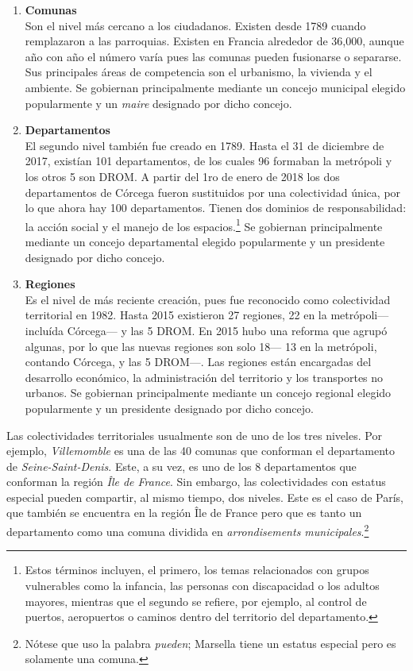 \begin{enumerate}
\item \textbf{Comunas} \\ 
Son el nivel más cercano a los ciudadanos. Existen desde 1789 cuando remplazaron a las parroquias. Existen en Francia alrededor de 36,000, aunque año con año el número varía pues las comunas pueden fusionarse o separarse. Sus principales áreas de competencia son el urbanismo, la vivienda y el ambiente. Se gobiernan principalmente mediante un concejo municipal elegido popularmente y un \textit{maire} designado por dicho concejo.

\item \textbf{Departamentos}\\ 
El segundo nivel también fue creado en 1789. Hasta el 31 de diciembre de 2017, existían 101 departamentos, de los cuales 96 formaban la metrópoli y los otros 5 son DROM. A partir del  1ro de enero de 2018 los dos departamentos de Córcega fueron sustituidos por una colectividad única, por lo que ahora hay 100 departamentos. Tienen dos dominios de responsabilidad: la acción social y el manejo de los espacios.\footnote{Estos términos incluyen, el primero, los temas relacionados con grupos vulnerables como la infancia, las personas con discapacidad o los adultos mayores, mientras que el segundo se refiere, por ejemplo, al control de puertos, aeropuertos o caminos dentro del territorio del departamento.} Se gobiernan principalmente mediante un concejo departamental elegido popularmente y un presidente designado por dicho concejo.

\item \textbf{Regiones}\\ 
Es el nivel de más reciente creación, pues fue reconocido como colectividad territorial en 1982. Hasta 2015 existieron 27 regiones, 22 en la metrópoli--- incluída Córcega--- y las 5 DROM. En 2015 hubo una reforma que agrupó algunas, por lo que las nuevas regiones son solo 18--- 13 en la metrópoli, contando Córcega, y las 5 DROM---. Las regiones están encargadas del desarrollo económico, la administración del territorio y los transportes no urbanos. Se gobiernan principalmente mediante un concejo regional elegido popularmente y un presidente designado por dicho concejo.
\end{enumerate} 

Las colectividades territoriales usualmente son de uno de los tres niveles. Por ejemplo, \textit{Villemomble} es una de las 40 comunas que conforman el departamento de \textit{Seine-Saint-Denis}. Este, a su vez, es uno de los 8 departamentos que conforman la región \textit{Île de France}. Sin embargo, las colectividades con estatus especial pueden compartir, al mismo tiempo, dos niveles. Este es el caso de París, que también se encuentra en la región Île de France pero que es tanto un departamento como una comuna dividida en \textit{arrondisements municipales}.\footnote{Nótese que uso la palabra \textit{pueden}; Marsella tiene un estatus especial pero es solamente una comuna.}\\

